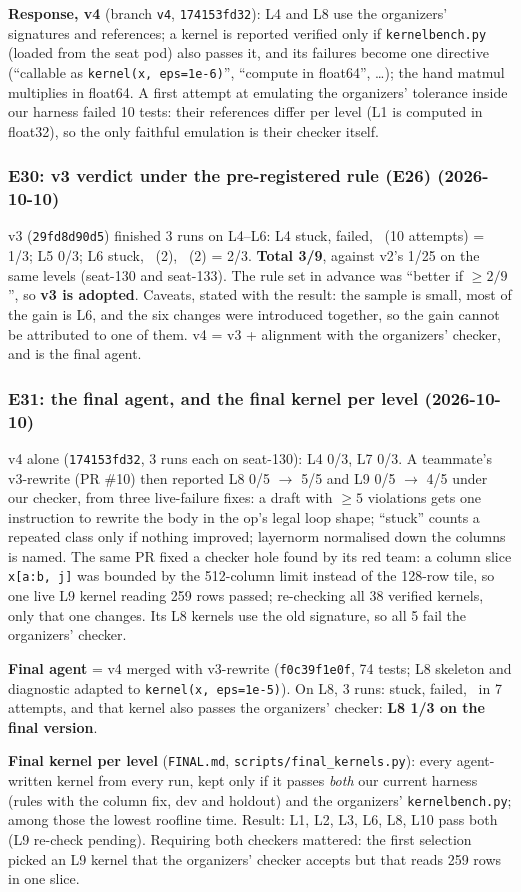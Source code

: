 \documentclass[11pt]{article}
\newcommand{\code}[1]{\texttt{#1}}
\newcommand{\entry}[2]{\subsubsection*{#1 \textnormal{\small(#2)}}}
\begin{document}
\textbf{Response, v4} (branch \code{v4}, \code{174153fd32}): L4 and L8 use the organizers' signatures and
references; a kernel is reported verified only if \code{kernelbench.py} (loaded from the seat pod) also
passes it, and its failures become one directive (``callable as \code{kernel(x, eps=1e-6)}'', ``compute in
float64'', \dots); the hand matmul multiplies in float64. A first attempt at emulating the organizers'
tolerance inside our harness failed 10 tests: their references differ per level (L1 is computed in
float32), so the only faithful emulation is their checker itself.

\entry{E30: v3 verdict under the pre-registered rule (E26)}{2026-10-10}
v3 (\code{29fd8d90d5}) finished 3 runs on L4--L6: L4 stuck, failed, \checkmark\ (10 attempts) = 1/3; L5 0/3;
L6 stuck, \checkmark\ (2), \checkmark\ (2) = 2/3. \textbf{Total 3/9}, against v2's 1/25 on the same levels
(seat-130 and seat-133). The rule set in advance was ``better if $\ge 2/9$'', so \textbf{v3 is adopted}.
Caveats, stated with the result: the sample is small, most of the gain is L6, and the six changes were
introduced together, so the gain cannot be attributed to one of them. v4 = v3 + alignment with the
organizers' checker, and is the final agent.

\entry{E31: the final agent, and the final kernel per level}{2026-10-10}
v4 alone (\code{174153fd32}, 3 runs each on seat-130): L4 0/3, L7 0/3. A teammate's v3-rewrite (PR \#10)
then reported L8 0/5 $\to$ 5/5 and L9 0/5 $\to$ 4/5 under our checker, from three live-failure fixes: a
draft with $\ge 5$ violations gets one instruction to rewrite the body in the op's legal loop shape;
``stuck'' counts a repeated class only if nothing improved; layernorm normalised down the columns is
named. The same PR fixed a checker hole found by its red team: a column slice \code{x[a:b, j]} was
bounded by the 512-column limit instead of the 128-row tile, so one live L9 kernel reading 259 rows
passed; re-checking all 38 verified kernels, only that one changes. Its L8 kernels use the old
signature, so all 5 fail the organizers' checker.

\textbf{Final agent} = v4 merged with v3-rewrite (\code{f0c39f1e0f}, 74 tests; L8 skeleton and
diagnostic adapted to \code{kernel(x, eps=1e-5)}). On L8, 3 runs: stuck, failed, \checkmark\ in 7
attempts, and that kernel also passes the organizers' checker: \textbf{L8 1/3 on the final version}.

\textbf{Final kernel per level} (\code{FINAL.md}, \code{scripts/final\_kernels.py}): every agent-written
kernel from every run, kept only if it passes \emph{both} our current harness (rules with the column fix,
dev and holdout) and the organizers' \code{kernelbench.py}; among those the lowest roofline time.
Result: L1, L2, L3, L6, L8, L10 pass both (L9 re-check pending). Requiring both checkers mattered: the first selection picked an L9 kernel that the
organizers' checker accepts but that reads 259 rows in one slice.
\end{document}
